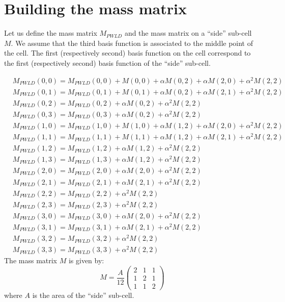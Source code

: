 \appendix
\section{Building the mass matrix}
Let us define the mass matrix $M_{PWLD}$ and the mass matrix on a
``side'' sub-cell $M$. We assume that the third basis function is associated
to the middle point of the cell. The first (respectively second) basis function
on the cell correspond to the first (respectively second) basis function of
the ``side'' sub-cell.

{\allowdisplaybreaks
\begin{align}
& M_{PWLD}(0,0) = M_{PWLD}(0,0) + M(0,0) + \alpha M(0,2) + \alpha M(2,0) + 
\alpha^2M(2,2)\\
& M_{PWLD}(0,1) = M_{PWLD}(0,1) + M(0,1) + \alpha M(0,2) + \alpha M(2,1) + 
\alpha^2M(2,2)\\
& M_{PWLD}(0,2) = M_{PWLD}(0,2) + \alpha M(0,2) + \alpha^2 M(2,2)\\
& M_{PWLD}(0,3) = M_{PWLD}(0,3) + \alpha M(0,2) + \alpha^2M(2,2)\\
& M_{PWLD}(1,0) = M_{PWLD}(1,0) + M(1,0) + \alpha M(1,2) + \alpha M(2,0) + 
\alpha^2M(2,2)\\
& M_{PWLD}(1,1) = M_{PWLD}(1,1) + M(1,1) + \alpha M(1,2) + \alpha M(2,1) + 
\alpha^2M(2,2)\\
& M_{PWLD}(1,2) = M_{PWLD}(1,2) + \alpha M(1,2) + \alpha^2M(2,2)\\
& M_{PWLD}(1,3) = M_{PWLD}(1,3) + \alpha M(1,2) + \alpha^2M(2,2)\\
& M_{PWLD}(2,0) = M_{PWLD}(2,0) + \alpha M(2,0) + \alpha^2M(2,2)\\
& M_{PWLD}(2,1) = M_{PWLD}(2,1) + \alpha M(2,1) + \alpha^2M(2,2)\\
& M_{PWLD}(2,2) = M_{PWLD}(2,2) + \alpha^2M(2,2)\\
& M_{PWLD}(2,3) = M_{PWLD}(2,3) + \alpha^2M(2,2)\\
& M_{PWLD}(3,0) = M_{PWLD}(3,0) + \alpha M(2,0) + \alpha^2M(2,2)\\
& M_{PWLD}(3,1) = M_{PWLD}(3,1) + \alpha M(2,1) + \alpha^2M(2,2)\\
& M_{PWLD}(3,2) = M_{PWLD}(3,2) + \alpha^2M(2,2)\\
& M_{PWLD}(3,3) = M_{PWLD}(3,3) + \alpha^2M(2,2)
\end{align}}    
The mass matrix $M$ is given by:
\begin{equation}
M = \frac{A}{12}
\begin{pmatrix}
2 & 1 & 1\\
1 & 2 & 1\\
1 & 1 & 2
\end{pmatrix}
\end{equation}
where $A$ is the area of the ``side'' sub-cell.
